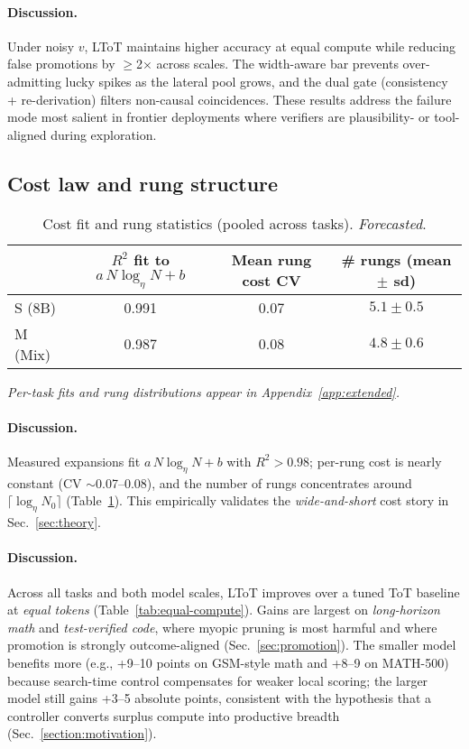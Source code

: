\documentclass{article}
\begin{document}
\paragraph{Discussion.}
Under noisy $v$, LToT maintains higher accuracy at equal compute while reducing false promotions by $\ge$2$\times$ across scales.
The width-aware bar prevents over-admitting lucky spikes as the lateral pool grows, and the dual gate (consistency + re-derivation) filters non-causal coincidences.
These results address the failure mode most salient in frontier deployments where verifiers are plausibility- or tool-aligned during exploration.

\subsection{Cost law and rung structure}
\label{subsec:cost-fit}

\begin{table}[t]
\centering
\caption{Cost fit and rung statistics (pooled across tasks). \emph{Forecasted}.}
\vspace{0.3em}
\begin{tabular}{lccc}
\toprule
 & \textbf{$R^2$ fit to $a\,N\log_\eta N{+}b$} & \textbf{Mean rung cost CV} & \textbf{\# rungs (mean $\pm$ sd)} \\
\midrule
S (8B)  & 0.991 & 0.07 & $5.1 \pm 0.5$ \\
M (Mix) & 0.987 & 0.08 & $4.8 \pm 0.6$ \\
\bottomrule
\end{tabular}
\label{tab:cost-fit}
\end{table}

\noindent\textit{Per-task fits and rung distributions appear in Appendix~\ref{app:extended}.}
\paragraph{Discussion.}
Measured expansions fit $a\,N\log_\eta N{+}b$ with $R^2{>}0.98$; per-rung cost is nearly constant (CV $\sim$0.07--0.08), and the number of rungs concentrates around $\lceil\log_\eta N_0\rceil$ (Table~\ref{tab:cost-fit}).
This empirically validates the \emph{wide-and-short} cost story in Sec.~\ref{sec:theory}.


\paragraph{Discussion.}
Across all tasks and both model scales, LToT improves over a tuned ToT baseline at \emph{equal tokens} (Table~\ref{tab:equal-compute}).
Gains are largest on \emph{long-horizon math} and \emph{test-verified code}, where myopic pruning is most harmful and where promotion is strongly outcome-aligned (Sec.~\ref{sec:promotion}).
The smaller model benefits more (e.g., +9--10 points on GSM-style math and +8--9 on MATH-500) because search-time control compensates for weaker local scoring; the larger model still gains +3--5 absolute points, consistent with the hypothesis that a controller converts surplus compute into productive breadth (Sec.~\ref{section:motivation}).
\end{document}
